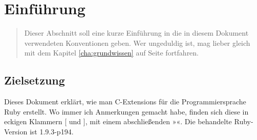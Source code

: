 \chapter{Einführung}
\label{cha:einfuhrung}

\begin{abstract}
  Dieser Abschnitt soll eine kurze Einführung in die in diesem
  Dokument verwendeten Konventionen geben. Wer ungeduldig ist, mag
  lieber gleich mit dem Kapitel \ref{cha:grundwissen} auf Seite
  \pageref{cha:grundwissen} fortfahren.
\end{abstract}

\section{Zielsetzung}

Dieses Dokument erklärt, wie man C-Extensions für die
Programmiersprache Ruby erstellt. Wo immer ich Anmerkungen gemacht
habe, finden sich diese in eckigen Klammern [ und ], mit einem
abschließenden »\emph{\transcomment}«. Die behandelte Ruby-Version
ist 1.9.3-p194.


